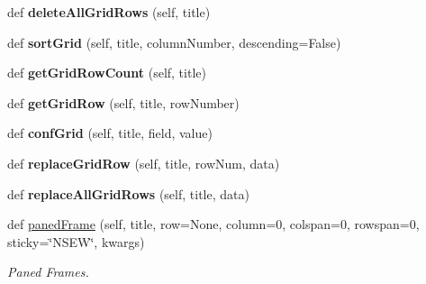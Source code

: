 \begin{DoxyCompactItemize}
\mbox{\label{class_python_01_g_u_i_1_1appjar_1_1gui_ab64251649fe2f18dfd4ea331d10507d4}} 
def {\bfseries delete\+All\+Grid\+Rows} (self, title)
\item 
\mbox{\label{class_python_01_g_u_i_1_1appjar_1_1gui_a0c772fd36fe943ddf9d6f7d4699d4b47}} 
def {\bfseries sort\+Grid} (self, title, column\+Number, descending=False)
\item 
\mbox{\label{class_python_01_g_u_i_1_1appjar_1_1gui_aa23692b54967147eecb04b397738cf0c}} 
def {\bfseries get\+Grid\+Row\+Count} (self, title)
\item 
\mbox{\label{class_python_01_g_u_i_1_1appjar_1_1gui_a980a224c0092bdfa7696da3d3210ea9b}} 
def {\bfseries get\+Grid\+Row} (self, title, row\+Number)
\item 
\mbox{\label{class_python_01_g_u_i_1_1appjar_1_1gui_a2e0fbedb93d5dafd843bf8db045c5404}} 
def {\bfseries conf\+Grid} (self, title, field, value)
\item 
\mbox{\label{class_python_01_g_u_i_1_1appjar_1_1gui_afb4d496e66d90b3eca8eb7d53b2e9348}} 
def {\bfseries replace\+Grid\+Row} (self, title, row\+Num, data)
\item 
\mbox{\label{class_python_01_g_u_i_1_1appjar_1_1gui_a8e47826ccdef8c31b87affa9ec1b8a58}} 
def {\bfseries replace\+All\+Grid\+Rows} (self, title, data)
\item 
\mbox{\label{class_python_01_g_u_i_1_1appjar_1_1gui_a8f042cd4ca5ae3acb471335d8df05ca3}} 
def \hyperlink{class_python_01_g_u_i_1_1appjar_1_1gui_a8f042cd4ca5ae3acb471335d8df05ca3}{paned\+Frame} (self, title, row=None, column=0, colspan=0, rowspan=0, sticky=\char`\"{}N\+S\+EW\char`\"{}, kwargs)
\begin{DoxyCompactList}\small\item\em Paned Frames. \end{DoxyCompactList}\item 
\mbox{\label{class_python_01_g_u_i_1_1appjar_1_1gui_ad15a5c1d9d31dc243fd67355dcb95f48}} 

\end{DoxyCompactItemize}
